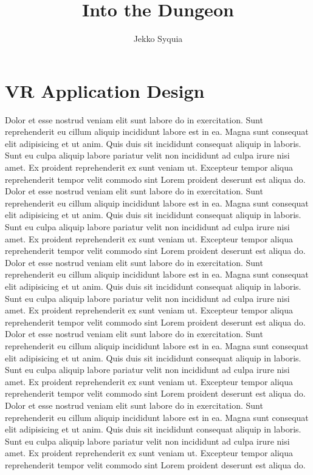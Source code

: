 \documentclass[12pt, twoside]{article}
\title{Into the Dungeon}
\author{Jekko Syquia}
\begin{document}
\maketitle
\titlepage
\newpage

\tableofcontents
\newpage

\section{VR Application Design}
Dolor et esse nostrud veniam elit sunt labore do in exercitation. Sunt reprehenderit eu cillum aliquip incididunt labore est in ea. Magna sunt consequat elit adipisicing et ut anim. Quis duis sit incididunt consequat aliquip in laboris. Sunt eu culpa aliquip labore pariatur velit non incididunt ad culpa irure nisi amet. Ex proident reprehenderit ex sunt veniam ut. Excepteur tempor aliqua reprehenderit tempor velit commodo sint Lorem proident deserunt est aliqua do.
Dolor et esse nostrud veniam elit sunt labore do in exercitation. Sunt reprehenderit eu cillum aliquip incididunt labore est in ea. Magna sunt consequat elit adipisicing et ut anim. Quis duis sit incididunt consequat aliquip in laboris. Sunt eu culpa aliquip labore pariatur velit non incididunt ad culpa irure nisi amet. Ex proident reprehenderit ex sunt veniam ut. Excepteur tempor aliqua reprehenderit tempor velit commodo sint Lorem proident deserunt est aliqua do.
Dolor et esse nostrud veniam elit sunt labore do in exercitation. Sunt reprehenderit eu cillum aliquip incididunt labore est in ea. Magna sunt consequat elit adipisicing et ut anim. Quis duis sit incididunt consequat aliquip in laboris. Sunt eu culpa aliquip labore pariatur velit non incididunt ad culpa irure nisi amet. Ex proident reprehenderit ex sunt veniam ut. Excepteur tempor aliqua reprehenderit tempor velit commodo sint Lorem proident deserunt est aliqua do.
Dolor et esse nostrud veniam elit sunt labore do in exercitation. Sunt reprehenderit eu cillum aliquip incididunt labore est in ea. Magna sunt consequat elit adipisicing et ut anim. Quis duis sit incididunt consequat aliquip in laboris. Sunt eu culpa aliquip labore pariatur velit non incididunt ad culpa irure nisi amet. Ex proident reprehenderit ex sunt veniam ut. Excepteur tempor aliqua reprehenderit tempor velit commodo sint Lorem proident deserunt est aliqua do.
Dolor et esse nostrud veniam elit sunt labore do in exercitation. Sunt reprehenderit eu cillum aliquip incididunt labore est in ea. Magna sunt consequat elit adipisicing et ut anim. Quis duis sit incididunt consequat aliquip in laboris. Sunt eu culpa aliquip labore pariatur velit non incididunt ad culpa irure nisi amet. Ex proident reprehenderit ex sunt veniam ut. Excepteur tempor aliqua reprehenderit tempor velit commodo sint Lorem proident deserunt est aliqua do.
\end{document}
